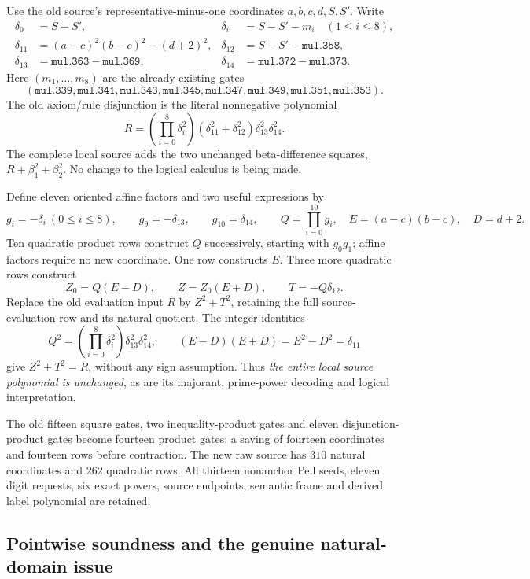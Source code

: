 Use the old source's representative-minus-one coordinates \(a,b,c,d,S,S'\).
Write
\begin{align*}
 \delta_0&=S-S',& \delta_i&=S-S'-m_i\quad(1\le i\le8),\\
 \delta_{11}&=(a-c)^2(b-c)^2-(d+2)^2,
 &\delta_{12}&=S-S'-\texttt{mul.358},\\
 \delta_{13}&=\texttt{mul.363}-\texttt{mul.369},
 &\delta_{14}&=\texttt{mul.372}-\texttt{mul.373}.
\end{align*}
Here \((m_1,\ldots,m_8)\) are the already existing gates
\[
 (\texttt{mul.339},\texttt{mul.341},\texttt{mul.343},\texttt{mul.345},
 \texttt{mul.347},\texttt{mul.349},\texttt{mul.351},\texttt{mul.353}).
\]
The old axiom/rule disjunction is the literal nonnegative polynomial
\[
 R=\left(\prod_{i=0}^{8}\delta_i^2\right)
       (\delta_{11}^2+\delta_{12}^2)\delta_{13}^2\delta_{14}^2.
 \tag{C1}
\]
The complete local source adds the two unchanged beta-difference squares,
\(R+\beta_1^2+\beta_2^2\). No change to the logical calculus is being made.

Define eleven oriented affine factors and two useful expressions by
\[
 g_i=-\delta_i\ (0\le i\le8),\qquad
 g_9=-\delta_{13},\qquad g_{10}=\delta_{14},\qquad
 Q=\prod_{i=0}^{10}g_i,\quad E=(a-c)(b-c),\quad D=d+2.
\]
Ten quadratic product rows construct \(Q\) successively, starting with
\(g_0g_1\); affine factors require no new coordinate. One row constructs
\(E\). Three more quadratic rows construct
\[
 Z_0=Q(E-D),\qquad Z=Z_0(E+D),\qquad T=-Q\delta_{12}.
 \tag{C2}
\]
Replace the old evaluation input \(R\) by \(Z^2+T^2\), retaining the full
source-evaluation row and its natural quotient. The integer identities
\[
 Q^2=\left(\prod_{i=0}^{8}\delta_i^2\right)\delta_{13}^2\delta_{14}^2,
 \qquad (E-D)(E+D)=E^2-D^2=\delta_{11}
\]
give \(Z^2+T^2=R\), without any sign assumption.
Thus \emph{the entire local source polynomial is unchanged}, as are its
majorant, prime-power decoding and logical interpretation.

The old fifteen square gates, two inequality-product gates and eleven
disjunction-product gates become fourteen product gates: a saving of
fourteen coordinates and fourteen rows before contraction. The new raw
source has \(310\) natural coordinates and \(262\) quadratic rows. All
thirteen nonanchor Pell seeds, eleven digit requests, six exact powers,
source endpoints, semantic frame and derived label polynomial are retained.

\subsection{Pointwise soundness and the genuine natural-domain issue}

